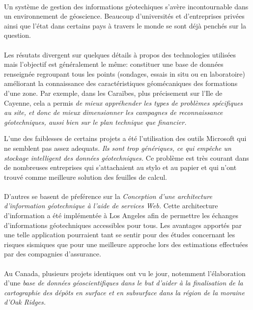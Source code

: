 \paragraph{}
Un système de gestion des informations géotechiques s'avère incontournable
dans un environnement de géoscience. Beaucoup d'universités et d'entreprises 
privées ainsi que l'état dans certains pays à travers le monde se sont déjà 
penchés sur la question. 
\paragraph{}
Les résutats divergent sur quelques détails à propos des technologies utilisées mais 
l'objectif est généralement le même: 
constituer une base de données renseignée regroupant tous les points (sondages, essais
in situ ou en laboratoire) améliorant la connaissance des caractéristiques géomécaniques des
formations d'une zone.
Par exemple, dans les Caraïbes, plus précisement sur l'Ile de Cayenne, cela a permis
\textit{ de mieux appréhender les types de problèmes
spécifiques au site, et donc de mieux dimensionner les campagnes de reconnaissance
géotechniques, aussi bien sur le plan technique que financier.}
\cite{Cayenne}
\par
L'une des faiblesses de certains projets a été l'utilisation des outils Microsoft
qui ne semblent pas assez 
adequats. \textit{Ils sont trop génériques, ce qui empêche un stockage intelligent des données géotechniques.}
\cite{antoljak2012subsurface}
Ce problème est très courant dans de nombreuses entreprises qui s'attachaient au stylo et au papier
et qui n'ont trouvé comme meilleure solution des feuilles de calcul.


\paragraph{}D'autres se basent de pŕeférence sur la \textit{Conception d'une architecture d'information 
géotechnique à l'aide de services Web.}
\cite{zimmermann2003design}
Cette architecture d'information a été implémentée à Los Angeles afin de permettre les échanges 
d'informations géotechniques accessibles pour tous. Les avantages apportés par une telle 
application pourraient tant se sentir pour des études concernant les risques sismiques que pour 
une meilleure approche lors des estimations effectuées par des compagnies d'assurance. 

\paragraph{}
Au Canada, plusieurs projets identiques ont vu le jour, notemment l'élabora\-tion d'une \textit{base 
de données géoscientifiques dans le but d’aider à la finalisation de la 
cartographie des dépôts en surface et en subsurface dans la région de la moraine d’Oak 
Ridges.}
\cite{russell1996regional}

